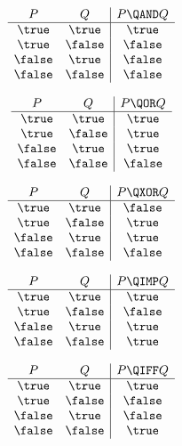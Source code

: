 \documentclass[handout]{mcs}
\begin{document}
\[
\begin{array}{cc|c}
P & Q & P \QAND Q \\ \hline
\true & \true & \true \\
\true & \false & \false \\
\false & \true & \false \\
\false & \false & \false
\end{array}
\]


\[
\begin{array}{cc|c}
P & Q & P \QOR Q \\ \hline
\true & \true & \true \\
\true & \false & \true \\
\false & \true & \true \\
\false & \false & \false
\end{array}
\]

\[
\begin{array}{cc|c}
P & Q & P \QXOR Q \\ \hline
\true & \true & \false \\
\true & \false & \true \\
\false & \true & \true \\
\false & \false & \false
\end{array}
\]

\[
\begin{array}{cc|c}
    P  &   Q    & P \QIMP Q \\ \hline
\true  & \true  & \true \\
\true  & \false & \false \\
\false & \true  & \true \\
\false & \false & \true  
\end{array}
\]

\[
\begin{array}{cc|c}
P & Q & P \QIFF Q \\ \hline
\true & \true & \true \\
\true & \false & \false \\
\false & \true & \false \\
\false & \false & \true
\end{array}
\]
\fi
\end{document}
